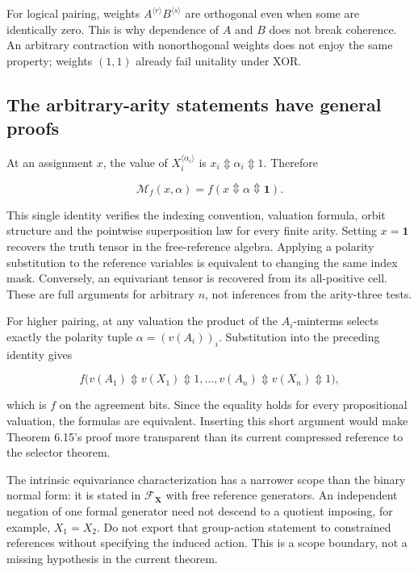 \documentclass[
  10pt,
]{article}
\begin{document}
For logical pairing, weights
\(A^{\langle r\rangle}B^{\langle s\rangle}\) are orthogonal even when
some are identically zero. This is why dependence of \(A\) and \(B\)
does not break coherence. An arbitrary contraction with nonorthogonal
weights does not enjoy the same property; weights \((1,1)\) already fail
unitality under XOR.

\subsection{The arbitrary-arity statements have general
proofs}\label{the-arbitrary-arity-statements-have-general-proofs}

At an assignment \(x\), the value of \(X_i^{\langle\alpha_i\rangle}\) is
\(x_i\Updownarrow\alpha_i\Updownarrow1\). Therefore

\[
\mathcal M_f(x,\alpha)=f(x\Updownarrow\alpha\Updownarrow\mathbf1).
\]

This single identity verifies the indexing convention, valuation
formula, orbit structure and the pointwise superposition law for every
finite arity. Setting \(x=\mathbf1\) recovers the truth tensor in the
free-reference algebra. Applying a polarity substitution to the
reference variables is equivalent to changing the same index mask.
Conversely, an equivariant tensor is recovered from its all-positive
cell. These are full arguments for arbitrary \(n\), not inferences from
the arity-three tests.

For higher pairing, at any valuation the product of the \(A_i\)-minterms
selects exactly the polarity tuple \(\alpha=(v(A_i))_i\). Substitution
into the preceding identity gives

\[
f\bigl(v(A_1)\Updownarrow v(X_1)\Updownarrow1,\ldots,
       v(A_n)\Updownarrow v(X_n)\Updownarrow1\bigr),
\]

which is \(f\) on the agreement bits. Since the equality holds for every
propositional valuation, the formulas are equivalent. Inserting this
short argument would make Theorem 6.15's proof more transparent than its
current compressed reference to the selector theorem.

The intrinsic equivariance characterization has a narrower scope than
the binary normal form: it is stated in \(\mathcal F_{\mathbf X}\) with
free reference generators. An independent negation of one formal
generator need not descend to a quotient imposing, for example,
\(X_1=X_2\). Do not export that group-action statement to constrained
references without specifying the induced action. This is a scope
boundary, not a missing hypothesis in the current theorem.
\end{document}
